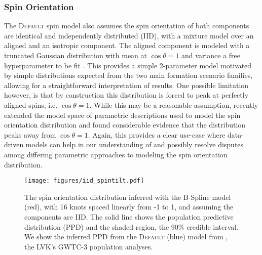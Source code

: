 \subsubsection{Spin Orientation}

The \textsc{Default} spin model also assumes the spin orientation of both components are identical and independently distributed (IID), with a mixture model over an
aligned and an isotropic component. The aligned component is modeled with a truncated Gaussian distribution with mean at $\cos{\theta}=1$ and variance a free 
hyperparameter to be fit \citep{Talbot_2017,Wysocki_2019,o3a_pop,o3b_astro_dist}. This provides a simple 2-parameter model motivated by simple distributions expected from the two main formation scenario families, allowing 
for a straightforward interpretation of results. One possible limitation however, is that by construction this distribution is forced to peak at perfectly aligned spins, 
i.e. $\cos{\theta}=1$. While this may be a reasonable assumption, \citet{spinitasyoulike} recently extended the model space of parametric descriptions 
used to model the spin orientation distribution and found considerable evidence that the distribution peaks away from $\cos{\theta}=1$. Again, this provides a clear 
use-case where data-driven models can help in our understanding of and possibly resolve disputes among differing parametric approaches to modeling the spin orientation distribution.

\begin{figure}
    \begin{centering}
        \texttt{[image: figures/iid\_spintilt.pdf]}
        \caption{The spin orientation distribution inferred with the B-Spline model (red), with 16 knots spaced linearly from -1 to 1, and 
        assuming the components are IID. The solid line shows the population predictive distribution (PPD) and the shaded region, the 90\% credible interval. 
        We show the inferred PPD from the \textsc{Default} (blue) model from \citet{o3b_astro_dist}, the LVK's GWTC-3 population analyses.}
        \label{fig:iid_spintilt_dist}
    \end{centering}
\end{figure}

